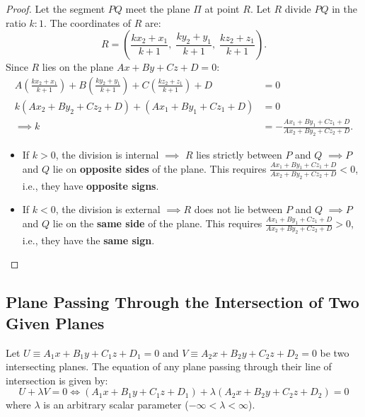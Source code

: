 \begin{proof}
Let the segment $PQ$ meet the plane $\Pi$ at point $R$.
Let $R$ divide $PQ$ in the ratio $k : 1$. The coordinates of $R$ are:
\begin{equation}
    R = \left(\frac{kx_2 + x_1}{k + 1}, \; \frac{ky_2 + y_1}{k + 1}, \; \frac{kz_2 + z_1}{k + 1}\right).
\end{equation}
Since $R$ lies on the plane $Ax + By + Cz + D = 0$:
\begin{align}
    A\left(\frac{kx_2 + x_1}{k+1}\right) + B\left(\frac{ky_2 + y_1}{k+1}\right) + C\left(\frac{kz_2 + z_1}{k+1}\right) + D &= 0 \nonumber\\
    k(Ax_2 + By_2 + Cz_2 + D) + (Ax_1 + By_1 + Cz_1 + D) &= 0 \nonumber\\
    \implies k &= -\frac{Ax_1 + By_1 + Cz_1 + D}{Ax_2 + By_2 + Cz_2 + D}.
\end{align}
\begin{itemize}
    \item If $k > 0$, the division is internal $\implies$ $R$ lies strictly between $P$ and $Q$ $\implies P$ and $Q$ lie on \textbf{opposite sides} of the plane. This requires $\frac{Ax_1+By_1+Cz_1+D}{Ax_2+By_2+Cz_2+D} < 0$, i.e., they have \textbf{opposite signs}.
    \item If $k < 0$, the division is external $\implies R$ does not lie between $P$ and $Q$ $\implies P$ and $Q$ lie on the \textbf{same side} of the plane. This requires $\frac{Ax_1+By_1+Cz_1+D}{Ax_2+By_2+Cz_2+D} > 0$, i.e., they have the \textbf{same sign}.
\end{itemize}
\end{proof}

\subsection{Plane Passing Through the Intersection of Two Given Planes}
\begin{theorembox}[Family of Planes $U + \lambda V = 0$]
Let $U \equiv A_1 x + B_1 y + C_1 z + D_1 = 0$ and $V \equiv A_2 x + B_2 y + C_2 z + D_2 = 0$ be two intersecting planes.
The equation of any plane passing through their line of intersection is given by:
\begin{equation}
    \boxed{U + \lambda V = 0 \iff (A_1 x + B_1 y + C_1 z + D_1) + \lambda(A_2 x + B_2 y + C_2 z + D_2) = 0}
\end{equation}
where $\lambda$ is an arbitrary scalar parameter ($-\infty < \lambda < \infty$).
\end{theorembox}

